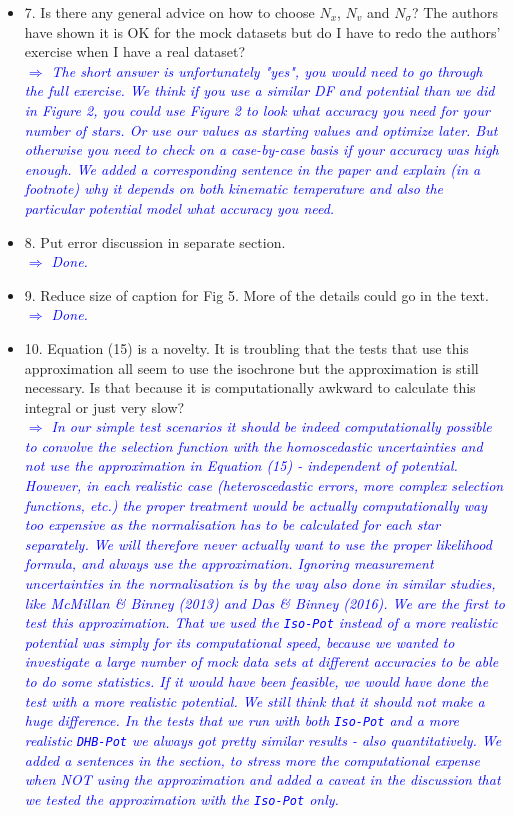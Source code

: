 \documentclass[10pt,a4paper]{article}
\newcommand{\Comment}[1]{\textsl{\textcolor{Blue}{$\Longrightarrow$ {#1}}}}
\begin{document}
\begin{itemize}
\item 7. Is there any general advice on how to choose $N_x$, $N_v$ and $N_\sigma$? The authors have shown it is OK for the mock datasets but do I have to redo the authors' exercise when I have a real dataset? \\\Comment{The short answer is unfortunately "yes", you would need to go through the full exercise. We think if you use a similar DF and potential than we did in Figure 2, you could use Figure 2 to look what accuracy you need for your number of stars. Or use our values as starting values and optimize later. But otherwise you need to check on a case-by-case basis if your accuracy was high enough. We added a corresponding sentence in the paper and explain (in a footnote) why it depends on both kinematic temperature and also the particular potential model what accuracy you need.}
\item 8. Put error discussion in separate section. \\\Comment{Done.}
\item 9. Reduce size of caption for Fig 5. More of the details could go in the text. \\\Comment{Done.}
\item 10. Equation (15) is a novelty. It is troubling that the tests that use this approximation all seem to use the isochrone but the approximation is still necessary. Is that because it is computationally awkward to calculate this integral or just very slow? \\\Comment{In our simple test scenarios it should be indeed computationally possible to convolve the selection function with the homoscedastic uncertainties and not use the approximation in Equation (15) - independent of potential. However, in each realistic case (heteroscedastic errors, more complex selection functions, etc.) the proper treatment would be actually computationally way too expensive as the normalisation has to be calculated for each star separately. We will therefore never actually want to use the proper likelihood formula, and always use the approximation. Ignoring measurement uncertainties in the normalisation is by the way also done in similar studies, like McMillan \& Binney (2013) and Das \& Binney (2016). We are the first to test this approximation. That we used the \texttt{Iso-Pot} instead of a more realistic potential was simply for its computational speed, because we wanted to investigate a large number of mock data sets at different accuracies to be able to do some statistics. If it would have been feasible, we would have done the test with a more realistic potential. We still think that it should not make a huge difference. In the tests that we run with both \texttt{Iso-Pot} and a more realistic \texttt{DHB-Pot} we always got pretty similar results - also quantitatively. We added a sentences in the section, to stress more the computational expense when NOT using the approximation and added a caveat in the discussion that we tested the approximation with the \texttt{Iso-Pot} only.}

\end{itemize}
\end{document}
